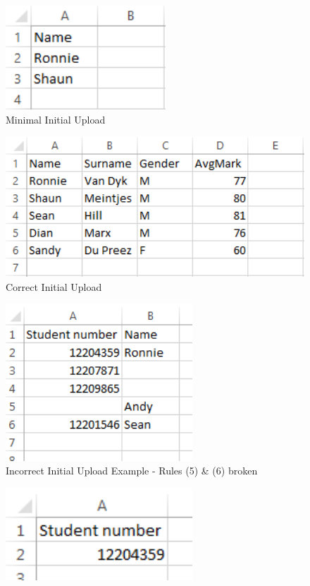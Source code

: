 \begin{itemize}
\begin{enumerate}
	\end{enumerate}
 \begin{figure}[H] 
	\centering
	\includegraphics[width=6cm]{./graphics/MinInitial.png}\par
	\caption{Minimal Initial Upload}
\end{figure}
 \begin{figure}[H] 
	\centering
	\includegraphics[width=13cm]{./graphics/CorrectInitial.png}\par
	\caption{Correct Initial Upload}
\end{figure}
 \begin{figure}[H] 
	\centering
	\includegraphics[width=7cm]{./graphics/IncorrectInitial.png}\par
	\caption{Incorrect Initial Upload Example - Rules (5) \& (6) broken}
\end{figure}
 \begin{figure}[H] 
	\centering
	\includegraphics[width=7cm]{./graphics/IncorrectInitial1.png}\par

\end{figure}
\end{itemize}
